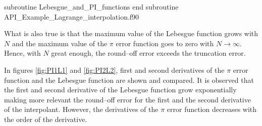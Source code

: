 \newpage
{}
{subroutine Lebesgue_and_PI_functions}
{end subroutine}
{API_Example_Lagrange_interpolation.f90}




What is also true is that the maximum value of the  Lebesgue function grows with $ N $ and the maximum value of the $ \pi $ error function goes to zero with $ N \rightarrow \infty $. Hence, with $ N $ great enough, the round--off error exceeds the truncation error. 








In figures \ref{fig:PI1L1} and  \ref{fig:PI2L2}, first and second derivatives of the $ \pi $ error function and the Lebesgue function are shown and compared.
It is observed that the first and second derivative of the Lebesgue function grow exponentially making more relevant the round--off error for the first and the second derivative of the interpolant. However, the derivatives of the $ \pi $ error function decreases with the order of the derivative.   


\FloatBarrier
